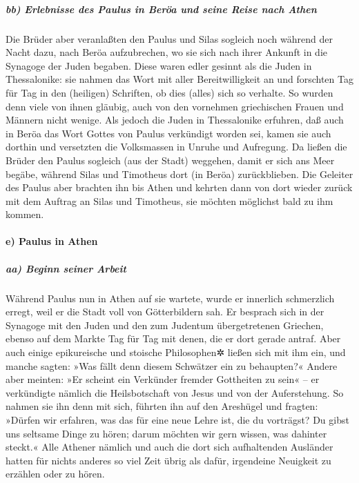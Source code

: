 \hypertarget{bb-erlebnisse-des-paulus-in-beruxf6a-und-seine-reise-nach-athen}{%
\subparagraph{bb) Erlebnisse des Paulus in Beröa und seine Reise nach
Athen}\label{bb-erlebnisse-des-paulus-in-beruxf6a-und-seine-reise-nach-athen}}

 Die Brüder aber veranlaßten den Paulus und Silas
sogleich noch während der Nacht dazu, nach Beröa aufzubrechen, wo sie
sich nach ihrer Ankunft in die Synagoge der Juden begaben.
 Diese waren edler gesinnt als die Juden in Thessalonike:
sie nahmen das Wort mit aller Bereitwilligkeit an und forschten Tag für
Tag in den (heiligen) Schriften, ob dies (alles) sich so verhalte.
 So wurden denn viele von ihnen gläubig, auch von den
vornehmen griechischen Frauen und Männern nicht wenige. 
Als jedoch die Juden in Thessalonike erfuhren, daß auch in Beröa das
Wort Gottes von Paulus verkündigt worden sei, kamen sie auch dorthin und
versetzten die Volksmassen in Unruhe und Aufregung.  Da
ließen die Brüder den Paulus sogleich (aus der Stadt) weggehen, damit er
sich ans Meer begäbe, während Silas und Timotheus dort (in Beröa)
zurückblieben.  Die Geleiter des Paulus aber brachten ihn
bis Athen und kehrten dann von dort wieder zurück mit dem Auftrag an
Silas und Timotheus, sie möchten möglichst bald zu ihm kommen.

\hypertarget{e-paulus-in-athen}{%
\paragraph{e) Paulus in Athen}\label{e-paulus-in-athen}}

\hypertarget{aa-beginn-seiner-arbeit}{%
\subparagraph{aa) Beginn seiner Arbeit}\label{aa-beginn-seiner-arbeit}}

 Während Paulus nun in Athen auf sie wartete, wurde er
innerlich schmerzlich erregt, weil er die Stadt voll von Götterbildern
sah.  Er besprach sich in der Synagoge mit den Juden und
den zum Judentum übergetretenen Griechen, ebenso auf dem Markte Tag für
Tag mit denen, die er dort gerade antraf.  Aber auch
einige epikureische und stoische Philosophen✲ ließen sich mit ihm ein,
und manche sagten: »Was fällt denn diesem Schwätzer ein zu behaupten?«
Andere aber meinten: »Er scheint ein Verkünder fremder Gottheiten zu
sein« -- er verkündigte nämlich die Heilsbotschaft von Jesus und von der
Auferstehung.  So nahmen sie ihn denn mit sich, führten
ihn auf den Areshügel und fragten: »Dürfen wir erfahren, was das für
eine neue Lehre ist, die du vorträgst?  Du gibst uns
seltsame Dinge zu hören; darum möchten wir gern wissen, was dahinter
steckt.«  Alle Athener nämlich und auch die dort sich
aufhaltenden Ausländer hatten für nichts anderes so viel Zeit übrig als
dafür, irgendeine Neuigkeit zu erzählen oder zu hören.


